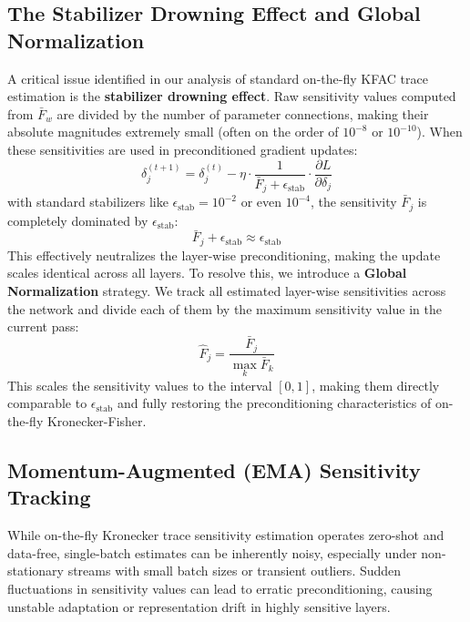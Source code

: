 \documentclass{article}
\theoremstyle{plain}
\theoremstyle{definition}
\theoremstyle{remark}
\begin{document}
\subsection{The Stabilizer Drowning Effect and Global Normalization}
A critical issue identified in our analysis of standard on-the-fly KFAC trace estimation is the \textbf{stabilizer drowning effect}. Raw sensitivity values computed from $\bar{F}_w$ are divided by the number of parameter connections, making their absolute magnitudes extremely small (often on the order of $10^{-8}$ or $10^{-10}$). When these sensitivities are used in preconditioned gradient updates:
\begin{equation}
    \delta_j^{(t+1)} = \delta_j^{(t)} - \eta \cdot \frac{1}{\bar{F}_j + \epsilon_{\text{stab}}} \cdot \frac{\partial L}{\partial \delta_j}
\end{equation}
with standard stabilizers like $\epsilon_{\text{stab}} = 10^{-2}$ or even $10^{-4}$, the sensitivity $\bar{F}_j$ is completely dominated by $\epsilon_{\text{stab}}$:
\begin{equation}
    \bar{F}_j + \epsilon_{\text{stab}} \approx \epsilon_{\text{stab}}
\end{equation}
This effectively neutralizes the layer-wise preconditioning, making the update scales identical across all layers. To resolve this, we introduce a \textbf{Global Normalization} strategy. We track all estimated layer-wise sensitivities across the network and divide each of them by the maximum sensitivity value in the current pass:
\begin{equation}
    \hat{F}_j = \frac{\bar{F}_j}{\max_{k} \bar{F}_k}
\end{equation}
This scales the sensitivity values to the interval $[0, 1]$, making them directly comparable to $\epsilon_{\text{stab}}$ and fully restoring the preconditioning characteristics of on-the-fly Kronecker-Fisher.

\subsection{Momentum-Augmented (EMA) Sensitivity Tracking}
While on-the-fly Kronecker trace sensitivity estimation operates zero-shot and data-free, single-batch estimates can be inherently noisy, especially under non-stationary streams with small batch sizes or transient outliers. Sudden fluctuations in sensitivity values can lead to erratic preconditioning, causing unstable adaptation or representation drift in highly sensitive layers. 
\end{document}
